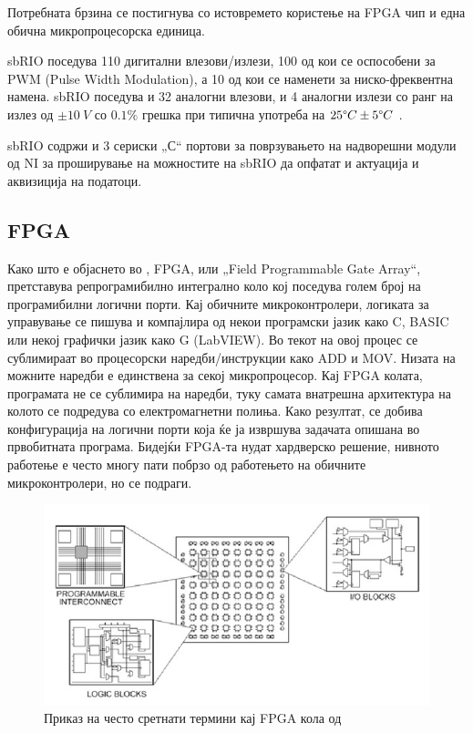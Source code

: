 \documentclass[12pt]{article}
\begin{document}
	Потребната брзина се постигнува со истовремето користење на FPGA чип и една обична микропроцесорска единица.

	sbRIO поседува 110 дигитални влезови/излези, 100 од кои се оспособени за PWM (Pulse Width Modulation), а 10 од кои се наменети за ниско-фреквентна намена. sbRIO поседува и 32 аналогни влезови, и 4 аналогни излези со ранг на излез од $ \pm 10\ V$ со $0.1\%$ грешка при типична употреба на $25\degree C \pm5\degree C$ \cite{sbrio}.

	sbRIO содржи и 3 сериски „С“ портови за поврзувањето на надворешни модули од NI за проширување на можностите на sbRIO да опфатат и актуација и аквизиција на податоци.

	\subsection{FPGA}
		Како што е објаснето во \cite{fpga}, FPGA, или „Field Programmable Gate Array“, претставува репрограмибилно интегрално коло кој поседува голем број на програмибилни логични порти. Кај обичните микроконтролери, логиката за управување се пишува и компајлира од некои програмски јазик како C, BASIC или некој графички јазик како G (LabVIEW). Во текот на овој процес се сублимираат во процесорски наредби/инструкции како ADD и MOV. Низата на можните наредби е единствена за секој микропроцесор. Кај FPGA колата, програмата не се сублимира на наредби, туку самата внатрешна архитектура на колото се подредува со електромагнетни полиња. Како резултат, се добива конфигурација на логични порти која ќе ја извршува задачата опишана во првобитната програма. Бидејќи FPGA-та нудат хардверско решение, нивното работење е често многу пати побрзо од работењето на обичните микроконтролери, но се подраги.

		\begin{figure}[h]
			\includegraphics[width=0.75\linewidth]{./images/fpga_diagram.jpg}
			\centering
			\caption{Приказ на често сретнати термини кај FPGA кола од \cite{experiments}}
			\label{fig:fpga_diagram_jpg}
			\end{figure}
\end{document}
